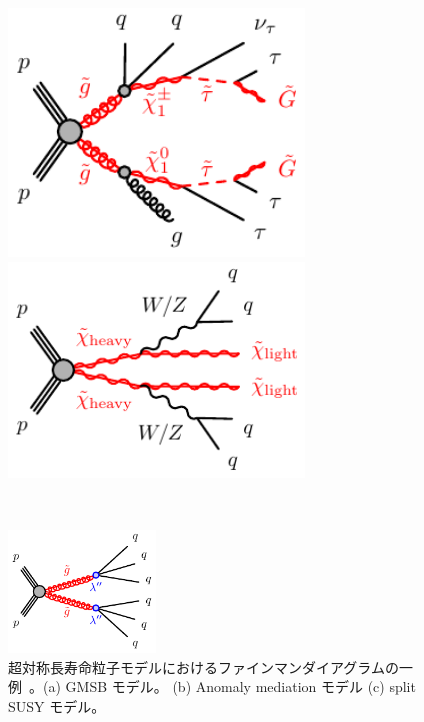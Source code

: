 \begin{figure}[H]
	\begin{minipage}{0.49\hsize}
	\centering
    \includegraphics[width=0.7\textwidth]{img/diagram/gogo-qqgtautautauvGG-GMSB.pdf}
    \subcaption{}
    \end{minipage}
    \begin{minipage}{0.49\hsize}
    \centering
    \includegraphics[width=0.7\textwidth]{img/diagram/chichi-qqqq-XX.pdf}
    \subcaption{}
    \end{minipage}\\
    \begin{minipage}{0.98\hsize}
    \centering
    \includegraphics[width=0.35\textwidth]{img/diagram/gogo-3q3q-RPV.pdf}
    \subcaption{}
    \end{minipage}
    \caption[超対称長寿命粒子モデルにおけるファインマンダイアグラムの一例]{超対称長寿命粒子モデルにおけるファインマンダイアグラムの一例~\cite{URL:03}。(a) GMSB モデル。 (b) Anomaly mediation モデル (c) split SUSY モデル。}
    \label{fig:dia}
\end{figure}


